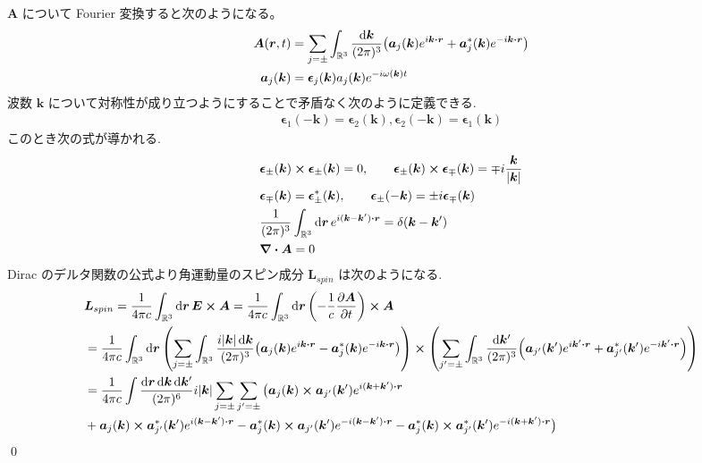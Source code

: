 \documentclass[uplatex,dvipdfmx,a4paper,11pt]{jlreq}
\makeatletter
\newcommand{\RR}{\mathbb{R}}
\newcommand{\EE}{\bm{E}}
\renewcommand{\AA}{\bm{A}}
\newcommand{\rr}{\bm{r}}
\newcommand{\kk}{\bm{k}}
\newcommand{\LL}{\bm{L}}
\newcommand{\ee}{\bm{\epsilon}}
\theoremstyle{definition}
\renewenvironment{proof}[1][\proofname]{\par
  \normalfont
  \topsep6\p@\@plus6\p@ \trivlist
  \item[\hskip\labelsep{\bfseries #1}\@addpunct{\bfseries}]\ignorespaces\quad\par
}{%
  \qed\endtrivlist\@endpefalse
}
\renewcommand\proofname{証明}
\makeatother
\begin{document}
\begin{proof}
  $\AA$ について Fourier 変換すると次のようになる。
  \begin{align}
    \AA(\rr, t)   & = \sum_{j=\pm}\int_{\RR^3}\frac{\dd{\kk}}{(2\pi)^3}\qty(\bm{a}_j(\kk)e^{i\kk\vdot\rr} + \bm{a}_j^*(\kk)e^{-i\kk\vdot\rr}) \\
    \bm{a}_j(\kk) & = \ee_j(\kk)a_j(\kk)e^{-i\omega(\kk)t}
  \end{align}
  波数 $\kk$ について対称性が成り立つようにすることで矛盾なく次のように定義できる.
  \begin{align}
    \ee_1(-\kk) = \ee_2(\kk), \ee_2(-\kk) = \ee_1(\kk)
  \end{align}
  このとき次の式が導かれる.
  \begin{align}
     & \ee_\pm(\kk)\cross\ee_\pm(\kk) = 0, \qquad \ee_\pm(\kk)\cross\ee_\mp(\kk) = \mp i\frac{\kk}{|\kk|} \\
     & \ee_\mp(\kk) = \ee_\pm^*(\kk), \qquad \ee_\pm(-\kk) = \pm i\ee_\mp(\kk)                            \\
     & \frac{1}{(2\pi)^3}\int_{\RR^3}\dd{\rr}e^{i(\kk - \kk')\vdot\rr} = \delta(\kk - \kk')               \\
     & \vnabla\vdot\AA = 0
  \end{align}
  Dirac のデルタ関数の公式より角運動量のスピン成分 $\LL_{spin}$ は次のようになる.
  \begin{align}
     & \LL_{spin} = \frac{1}{4\pi c}\int_{\RR^3}\dd{\rr}\EE\cross\AA = \frac{1}{4\pi c}\int_{\RR^3}\dd{\rr}\qty(-\frac{1}{c}\pdv{\AA}{t})\cross\AA                                                                                                                                                                              \\
     & = \frac{1}{4\pi c}\int_{\RR^3}\dd{\rr}\qty(\sum_{j=\pm}\int_{\RR^3}\frac{i|\kk|\dd{\kk}}{(2\pi)^3}\qty(\bm{a}_j(\kk)e^{i\kk\vdot\rr} - \bm{a}_j^*(\kk)e^{-i\kk\vdot\rr}))\cross\qty(\sum_{j'=\pm}\int_{\RR^3}\frac{\dd{\kk'}}{(2\pi)^3}\qty(\bm{a}_{j'}(\kk')e^{i\kk'\vdot\rr} + \bm{a}_{j'}^*(\kk')e^{-i\kk'\vdot\rr})) \\
     & = \frac{1}{4\pi c}\int\frac{\dd{\rr}\dd{\kk}\dd{\kk'}}{(2\pi)^6}i|\kk|\sum_{j=\pm}\sum_{j'=\pm}\big(\bm{a}_j(\kk)\cross\bm{a}_{j'}(\kk')e^{i(\kk + \kk')\vdot\rr}                                                                                                                                                        \\
     & + \bm{a}_j(\kk)\cross\bm{a}_{j'}^*(\kk')e^{i(\kk - \kk')\vdot\rr} - \bm{a}_j^*(\kk)\cross\bm{a}_{j'}(\kk')e^{-i(\kk - \kk')\vdot\rr} - \bm{a}_j^*(\kk)\cross\bm{a}_{j'}^*(\kk')e^{-i(\kk+\kk')\vdot\rr}\big)                                                                                                             \\

\end{align}
\end{proof}
\end{document}
